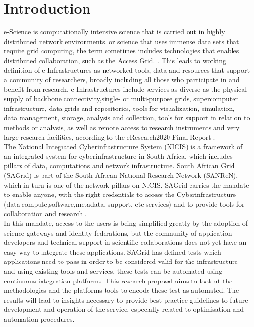 \documentclass [titlepage,11pt]{article}
\begin{document}
\section{Introduction}

e-Science  is computationally intensive science that is carried out in highly distributed network environments, or science that uses immense data sets that require grid computing, the term sometimes includes technologies that enables distributed collaboration, such as the Access Grid. \citep{escience}. This leads to working definition of e-Infrastructures as networked tools, data and resources that support a community of researchers, broadly including all those who participate in and benefit from research. e-Infrastructures include services as diverse as the physical supply of backbone connectivity,single- or multi-purpose grids, supercomputer infrastructure, data grids and repositories, tools for visualization, simulation, data management, storage, analysis and collection, tools for
support in relation to methods or analysis, as well as remote access to research instruments and very large research facilities, according to the eResearch2020 Final Report \citep{eresearch}.\\ 

The National Integrated Cyberinfrastructure System (NICIS) is a framework of an integrated system for cyberinfrastructure in South Africa, which includes pillars of data, computations and network infrastructure. South African Grid (SAGrid) is part of the South African National Research Network (SANReN), which in-turn is one of the network pillars on NICIS. SAGrid carries the mandate to enable anyone, with the right credentials to access the Cyberinfrastructure (data,compute,software,metadata, support, etc services) and to provide tools for collaboration and research \citep{nicis}. \\

In this mandate, access to the users is being simplified greatly by the adoption of science gateways and identity federations, but the community of application developers and technical support in scientific collaborations does not yet have an easy way to integrate these applications. SAGrid has defined tests which applications need to pass in order to be considered valid for the infrastructure and using existing tools and services, these tests can be automated using continuous integration platforms. This research proposal aims to look at the methodologies and the platforms tools to encode these test as automated. The results will lead to insights necessary to provide best-practice guidelines to future development and operation of the service, especially related to optimisation and automation procedures.\\
\end{document}
